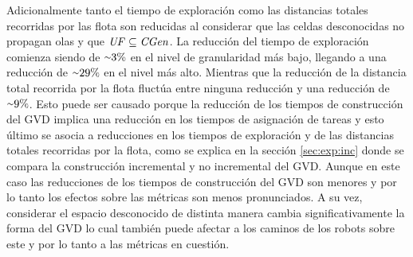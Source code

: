Adicionalmente tanto el tiempo de exploración como las distancias totales
recorridas por las flota son reducidas al considerar que las celdas
desconocidas no propagan olas y que $\mathit{UF} \subseteq \mathit{CGen}$. La
reducción del tiempo de exploración comienza siendo de ${\smallsim}3\%$ en el
nivel de granularidad más bajo, llegando a una reducción de ${\smallsim}29\%$
en el nivel más alto. Mientras que la reducción de la distancia total recorrida
por la flota fluctúa entre ninguna reducción y una reducción de
${\smallsim}9\%$. Esto puede ser causado porque la reducción de los tiempos de
construcción del GVD implica una reducción en los tiempos de asignación de
tareas y esto último se asocia a reducciones en los tiempos de exploración y de
las distancias totales recorridas por la flota, como se explica en la sección
\ref{sec:exp:inc} donde se compara la construcción incremental y no incremental
del GVD. Aunque en este caso las reducciones de los tiempos de construcción del
GVD son menores y por lo tanto los efectos sobre las métricas son menos
pronunciados. A su vez, considerar el espacio desconocido de distinta manera
cambia significativamente la forma del GVD lo cual también puede afectar a los
caminos de los robots sobre este y por lo tanto a las métricas en cuestión.




